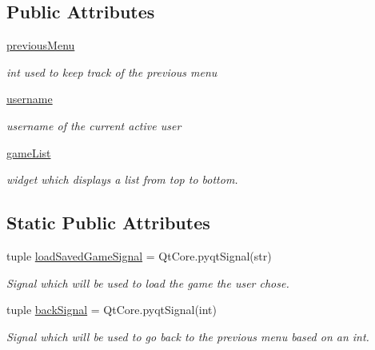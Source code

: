 \subsection*{Public Attributes}
\begin{DoxyCompactItemize}
\item 
\hypertarget{classsrc_1_1load__menu_1_1_load_menu_a266279b7ed3e68889b07c1785251c806}{}\hyperlink{classsrc_1_1load__menu_1_1_load_menu_a266279b7ed3e68889b07c1785251c806}{previous\+Menu}\label{classsrc_1_1load__menu_1_1_load_menu_a266279b7ed3e68889b07c1785251c806}

\begin{DoxyCompactList}\small\item\em int used to keep track of the previous menu \end{DoxyCompactList}\item 
\hypertarget{classsrc_1_1load__menu_1_1_load_menu_ab1c940f6352015a62d85b668bc6ebb01}{}\hyperlink{classsrc_1_1load__menu_1_1_load_menu_ab1c940f6352015a62d85b668bc6ebb01}{username}\label{classsrc_1_1load__menu_1_1_load_menu_ab1c940f6352015a62d85b668bc6ebb01}

\begin{DoxyCompactList}\small\item\em username of the current active user \end{DoxyCompactList}\item 
\hyperlink{classsrc_1_1load__menu_1_1_load_menu_af17d0436c9ca2ece0594fbcfd6380162}{game\+List}
\begin{DoxyCompactList}\small\item\em widget which displays a list from top to bottom. \end{DoxyCompactList}\end{DoxyCompactItemize}
\subsection*{Static Public Attributes}
\begin{DoxyCompactItemize}
\item 
tuple \hyperlink{classsrc_1_1load__menu_1_1_load_menu_a9f994468ddeb9d648ce5a68c001fbb36}{load\+Saved\+Game\+Signal} = Qt\+Core.\+pyqt\+Signal(str)
\begin{DoxyCompactList}\small\item\em Signal which will be used to load the game the user chose. \end{DoxyCompactList}\item 
tuple \hyperlink{classsrc_1_1load__menu_1_1_load_menu_a213d15dc1a4c3b77947ea334896268c5}{back\+Signal} = Qt\+Core.\+pyqt\+Signal(int)
\begin{DoxyCompactList}\small\item\em Signal which will be used to go back to the previous menu based on an int. \end{DoxyCompactList}\end{DoxyCompactItemize}


